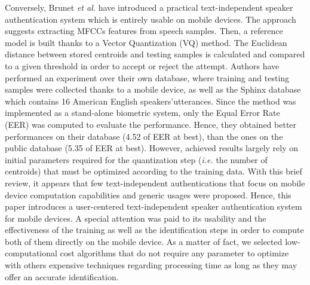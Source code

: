 \documentclass[cryptography,article,submit,moreauthors,pdftex,10pt,a4paper]{mdpi}
\begin{document}
Conversely, Brunet \textit{et al.} \cite{26} have introduced a practical text-independent speaker authentication system which is entirely usable on mobile devices. The approach suggests extracting MFCCs features from speech samples. Then, a reference model is built thanks to a Vector Quantization (VQ) method. The Euclidean distance between stored centroids and testing samples is calculated and compared to a given threshold in order to accept or reject the attempt. Authors have performed an experiment over their own database, where training and testing samples were collected thanks to a mobile device, as well as the Sphinx database which contains 16 American English speakers\textquoteright utterances. Since the method was implemented as a stand-alone biometric system, only the Equal Error Rate (EER) was computed to evaluate the performance. Hence, they obtained better performances on their database (4.52 of EER at best), than the ones on the public database (5.35 of EER at best). However, achieved results largely rely on initial parameters required for the quantization step (\textit{i.e.} the number of centroids) that must be optimized according to the training data. With this brief review, it appears that few text-independent authentications that focus on mobile device computation capabilities and generic usages were proposed. Hence, this paper introduces a user-centered text-independent speaker authentication system for mobile devices. A special attention was paid to its usability and the effectiveness of the training as well as the identification steps in order to compute both of them directly on the mobile device. As a matter of fact, we selected low-computational cost algorithms that do not require any parameter to optimize with others expensive techniques regarding processing time as long as they may offer an accurate identification.

\end{document}

